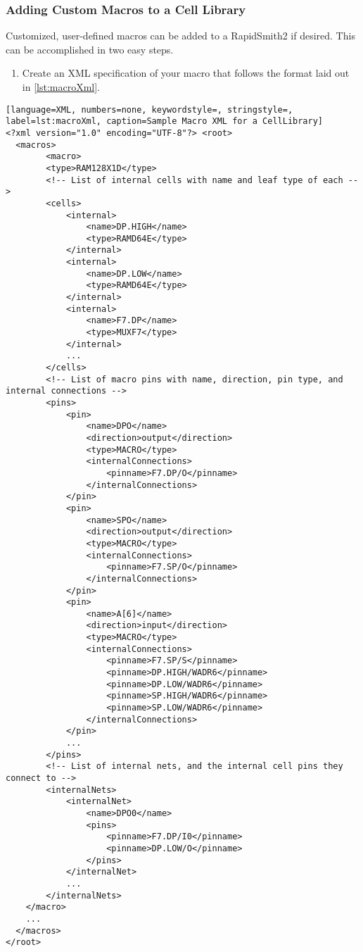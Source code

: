 \subsubsection{Adding Custom Macros to a Cell Library} \label{sec:customMacros}
Customized, user-defined macros can be added to a RapidSmith2 
if desired. This can be accomplished in two easy steps. 

\begin {enumerate}
  \item Create an XML specification
  of your macro that follows the format laid out in \autoref{lst:macroXml}.
\end {enumerate}

\begin{lstlisting}[language=XML, numbers=none, keywordstyle=, stringstyle=,
label=lst:macroXml, caption=Sample Macro XML for a CellLibrary] 
<?xml version="1.0" encoding="UTF-8"?> <root>	
  <macros>    
		<macro>
        <type>RAM128X1D</type>
        <!-- List of internal cells with name and leaf type of each -->
        <cells>
            <internal>
                <name>DP.HIGH</name>
                <type>RAMD64E</type>
            </internal>
            <internal>
                <name>DP.LOW</name>
                <type>RAMD64E</type>
            </internal>
            <internal>
                <name>F7.DP</name>
                <type>MUXF7</type>
            </internal>
			...
        </cells>
        <!-- List of macro pins with name, direction, pin type, and internal connections --> 
        <pins>
            <pin>
                <name>DPO</name>
                <direction>output</direction>
                <type>MACRO</type>
                <internalConnections>
                    <pinname>F7.DP/O</pinname>
                </internalConnections>
            </pin>
            <pin>
                <name>SPO</name>
                <direction>output</direction>
                <type>MACRO</type>
                <internalConnections>
                    <pinname>F7.SP/O</pinname>
                </internalConnections>
            </pin>
            <pin>
                <name>A[6]</name>
                <direction>input</direction>
                <type>MACRO</type>
                <internalConnections>
                    <pinname>F7.SP/S</pinname>
                    <pinname>DP.HIGH/WADR6</pinname>
                    <pinname>DP.LOW/WADR6</pinname>
                    <pinname>SP.HIGH/WADR6</pinname>
                    <pinname>SP.LOW/WADR6</pinname>
                </internalConnections>
            </pin>
            ...
        </pins>
        <!-- List of internal nets, and the internal cell pins they connect to --> 
        <internalNets>
            <internalNet>
                <name>DPO0</name>
                <pins>
                    <pinname>F7.DP/I0</pinname>
                    <pinname>DP.LOW/O</pinname>
                </pins>
            </internalNet>
            ...
        </internalNets>
    </macro>
	...
  </macros>
</root>
\end{lstlisting}

